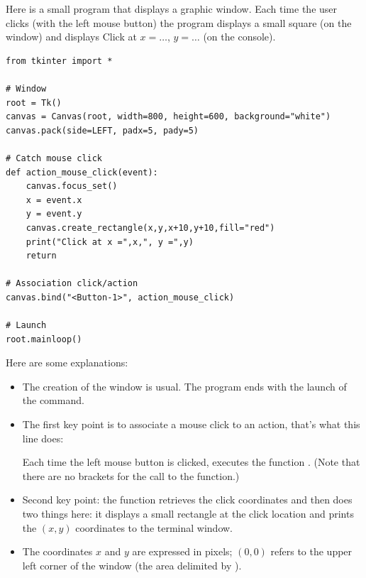 \documentclass[11pt,class=report,crop=false]{standalone}
\begin{document}
\begin{cours}


Here is a small program that displays a graphic window. Each time the user clicks (with the left mouse button) the program displays a small square (on the window) and displays \og{}Click at $x=\ldots$, $y=\ldots$\fg{} (on the console).

\begin{lstlisting}
from tkinter import *

# Window
root = Tk()
canvas = Canvas(root, width=800, height=600, background="white")
canvas.pack(side=LEFT, padx=5, pady=5)

# Catch mouse click
def action_mouse_click(event):
    canvas.focus_set()
    x = event.x
    y = event.y
    canvas.create_rectangle(x,y,x+10,y+10,fill="red")
    print("Click at x =",x,", y =",y)
    return

# Association click/action
canvas.bind("<Button-1>", action_mouse_click)

# Launch
root.mainloop()
\end{lstlisting}


Here are some explanations:
\begin{itemize}
  \item The creation of the window is usual. The program ends with the launch of the  command.
  
  \item The first key point is to associate a mouse click to an action, that's what this line does: 

Each time the left mouse button is clicked, \Python{} executes the function . (Note that there are no brackets for the call to the function.)

   \item Second key point: the  function retrieves the click coordinates and then does two things here: it displays a small rectangle at the click location and prints the $(x,y)$ coordinates to the terminal window.
   
   \item The coordinates $x$ and $y$ are expressed in pixels; $(0,0)$ refers to the upper left corner of the window (the area delimited by ).
\end{itemize}
\end{cours}
\end{document}
